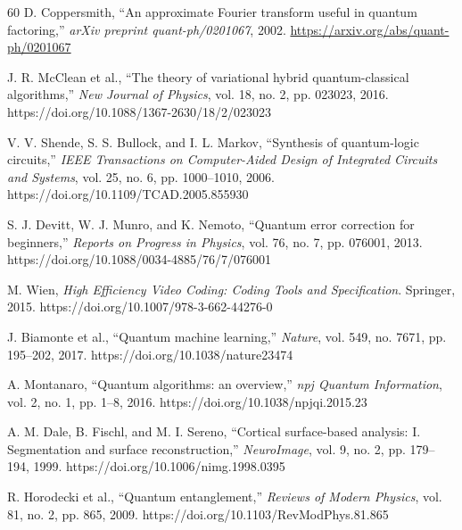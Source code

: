 \documentclass[11pt,a4paper]{article}
\begin{document}
\begin{thebibliography}{60}
D. Coppersmith, ``An approximate Fourier transform useful in quantum factoring,'' \textit{arXiv preprint quant-ph/0201067}, 2002. \url{https://arxiv.org/abs/quant-ph/0201067}

J. R. McClean et al., ``The theory of variational hybrid quantum-classical algorithms,'' \textit{New Journal of Physics}, vol. 18, no. 2, pp. 023023, 2016. https://doi.org/10.1088/1367-2630/18/2/023023


V. V. Shende, S. S. Bullock, and I. L. Markov, ``Synthesis of quantum-logic circuits,'' \textit{IEEE Transactions on Computer-Aided Design of Integrated Circuits and Systems}, vol. 25, no. 6, pp. 1000--1010, 2006. https://doi.org/10.1109/TCAD.2005.855930

S. J. Devitt, W. J. Munro, and K. Nemoto, ``Quantum error correction for beginners,'' \textit{Reports on Progress in Physics}, vol. 76, no. 7, pp. 076001, 2013. https://doi.org/10.1088/0034-4885/76/7/076001

M. Wien, \textit{High Efficiency Video Coding: Coding Tools and Specification}. Springer, 2015. https://doi.org/10.1007/978-3-662-44276-0

J. Biamonte et al., ``Quantum machine learning,'' \textit{Nature}, vol. 549, no. 7671, pp. 195--202, 2017. https://doi.org/10.1038/nature23474


A. Montanaro, ``Quantum algorithms: an overview,'' \textit{npj Quantum Information}, vol. 2, no. 1, pp. 1--8, 2016. https://doi.org/10.1038/npjqi.2015.23

A. M. Dale, B. Fischl, and M. I. Sereno, ``Cortical surface-based analysis: I. Segmentation and surface reconstruction,'' \textit{NeuroImage}, vol. 9, no. 2, pp. 179--194, 1999. https://doi.org/10.1006/nimg.1998.0395

R. Horodecki et al., ``Quantum entanglement,'' \textit{Reviews of Modern Physics}, vol. 81, no. 2, pp. 865, 2009. https://doi.org/10.1103/RevModPhys.81.865


\end{thebibliography}
\end{document}
